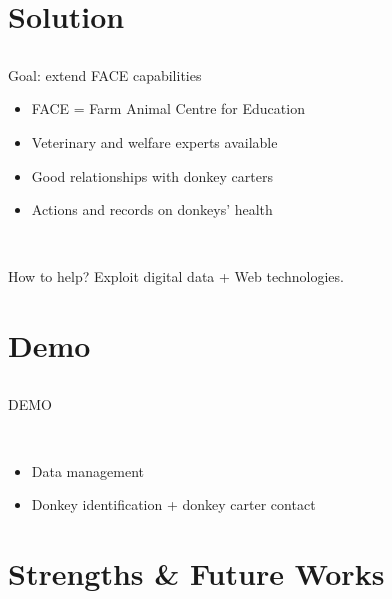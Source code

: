 \documentclass{beamer}
\begin{document}
\section{Solution}
\subsection{}

\begin{frame}
Goal: extend FACE capabilities
\begin{itemize}
 \item FACE = Farm Animal Centre for Education
 \pause
 \item Veterinary and welfare experts available
 \pause
 \item Good relationships with donkey carters
 \pause
 \item Actions and records on donkeys' health
\end{itemize}
~\\
\pause
\begin{exampleblock}{How to help?}
Exploit digital data + Web technologies.
\end{exampleblock}

\end{frame}

\section{Demo}
\subsection{}

\begin{frame}
\begin{center}
DEMO
\end{center}
~\\
\begin{itemize}
 \item Data management
 \pause
 \item Donkey identification + donkey carter contact
\end{itemize}
\end{frame}

\section{Strengths \& Future Works}
\subsection{}
\end{document}
